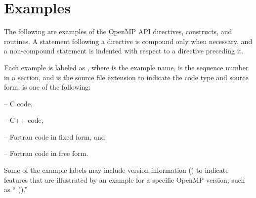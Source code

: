 
\chapter*{Examples}
\label{chap:examples}
The following are examples of the OpenMP API directives, constructs, and routines.
\ccppspecificstart
A statement following a directive is compound only when necessary, and a 
non-compound statement is indented with respect to a directive preceding it.
\ccppspecificend

Each example is labeled as , where  is 
the example name,  is the sequence number in a section, and 
 is the source file extension to indicate the code type and 
source form.   is one of the following:
\begin{compactitem}
\item {} -- C code,
\item {} -- C++ code,
\item {} -- Fortran code in fixed form, and
\item {} -- Fortran code in free form.
\end{compactitem}

Some of the example labels may include version information 
() to indicate features that are illustrated
by an example for a specific OpenMP version, such as `` 
\;().''

